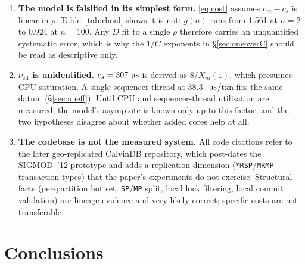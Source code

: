 \documentclass[11pt,a4paper]{article}
\newcommand{\hot}{C}
\newcommand{\pernode}{X_m}
\newcommand{\msecs}{\ensuremath{\,\text{\textmu}\text{s}}}
\newcommand{\nueff}{\ensuremath{\nu_{\mathrm{eff}}}}
\newcommand{\gRatio}{g(n)}
\begin{document}
\begin{enumerate}[leftmargin=1.6em,itemsep=3pt]
      The non-circular content is (i) the falsification test of
      \S\ref{sec:pernode}, which uses only the paper's own latency floor;
      (ii) the $\rho$-linearity falsification of \S\ref{sec:rhonl}, which is
      internal to the data and needs no external assumption; and (iii) the
      capture of the $\rho{=}1,\ n{=}2$ anti-scaling point. The
      single-$D$ form does \emph{not} fit small-$n$ behaviour
      ($\approx\num{7300}$ predicted vs.\ \num{5268} measured at $n=2$,
      $\rho=1$); \eqref{eq:corrected} splits the penalty into a barrier floor
      and a saturating skew term to address this.
\item \textbf{The model is falsified in its simplest form.} \eqref{eq:cost}
      assumes $c_m - c_s$ is linear in $\rho$. Table~\ref{tab:rhonl} shows it
      is not: $\gRatio$ runs from \num{1.561} at $n{=}2$ to \num{0.924} at
      $n{=}100$. Any $D$ fit to a single $\rho$ therefore carries an
      unquantified systematic error, which is why the $1/\hot$ exponents in
      \S\ref{sec:oneoverC} should be read as descriptive only.
\item \textbf{$\nueff$ is unidentified.} $c_s=\SI{307}{\msecs}$ is derived
      as $8/\pernode(1)$, which presumes CPU saturation. A single sequencer
      thread at \SI{38.3}{\msecs}/txn fits the same datum
      (\S\ref{sec:nueff}). Until CPU and sequencer-thread utilisation are
      measured, the model's asymptote is known only up to this factor, and the
      two hypotheses disagree about whether added cores help at all.
\item \textbf{The codebase is not the measured system.} All code citations
      refer to the later geo-replicated CalvinDB repository, which post-dates
      the SIGMOD~'12 prototype and adds a replication dimension
      (\texttt{MRSP}/\texttt{MRMP} transaction types) that the paper's
      experiments do not exercise. Structural facts (per-partition hot set,
      \texttt{SP}/\texttt{MP} split, local lock filtering, local commit
      validation) are lineage evidence and very likely correct; specific costs
      are not transferable.
\end{enumerate}

\section{Conclusions}
\end{document}
